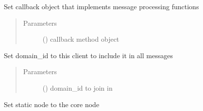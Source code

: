 \documentclass[letterpaper,10pt,english]{sphinxmanual}
\begin{document}
\begin{fulllineitems}
\begin{fulllineitems}
\begin{quote}
\begin{description}
\end{description}\end{quote}

\end{fulllineitems}


\begin{fulllineitems}
\label{\detokenize{bbc1.core.bbc_app:bbc1.core.bbc_app.BBcAppClient.set_callback}}
Set callback object that implements message processing functions
\begin{quote}\begin{description}
\item[{Parameters}] \leavevmode
{} () \textendash{} callback method object

\end{description}\end{quote}

\end{fulllineitems}


\begin{fulllineitems}
\label{\detokenize{bbc1.core.bbc_app:bbc1.core.bbc_app.BBcAppClient.set_domain_id}}
Set domain\_id to this client to include it in all messages
\begin{quote}\begin{description}
\item[{Parameters}] \leavevmode
{} () \textendash{} domain\_id to join in

\end{description}\end{quote}

\end{fulllineitems}


\begin{fulllineitems}
\label{\detokenize{bbc1.core.bbc_app:bbc1.core.bbc_app.BBcAppClient.set_domain_static_node}}
Set static node to the core node


\end{fulllineitems}
\end{fulllineitems}
\end{document}
